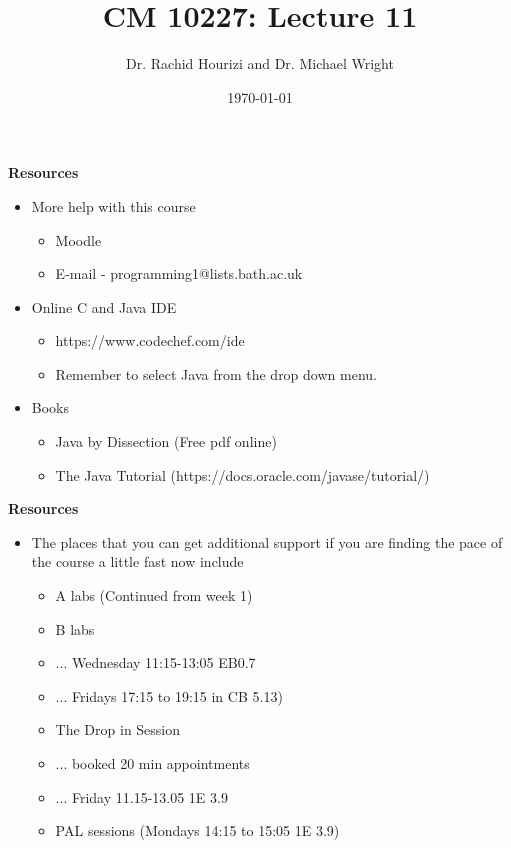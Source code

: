 \documentclass{beamer}
\begin{document}

\title{CM 10227: Lecture 11}
\author{Dr. Rachid Hourizi and Dr. Michael Wright}
\date{\today}
\frame{\titlepage}

\begin{frame} 
\begin{center}
\textbf{Resources}
\end{center}
\begin{itemize}
\item More help with this course
\begin{itemize}
\item Moodle
\item E-mail - programming1@lists.bath.ac.uk
\end{itemize}
\item Online C and Java IDE
\begin{itemize}
\item https://www.codechef.com/ide
\item Remember to select Java from the drop down menu.
\end{itemize}
\item Books
\begin{itemize}
\item Java by Dissection (Free pdf online)
\item The Java Tutorial (https://docs.oracle.com/javase/tutorial/)
\end{itemize}
\end{itemize}
\end{frame}

\begin{frame} 
\begin{center}
\textbf{Resources}
\end{center}
\begin{itemize}
\item The places that you can get additional support if you are finding the pace of the course a little fast now include
\begin{itemize}
\item A labs (Continued from week 1)
\item B labs 
\item ... Wednesday 11:15-13:05 EB0.7
\item ... Fridays 17:15 to 19:15 in CB 5.13)
\item The Drop in Session 
\item ... booked 20 min appointments
\item ... Friday 11.15-13.05 1E 3.9
\item PAL sessions (Mondays 14:15 to 15:05 1E 3.9)
\end{itemize}
\end{itemize}
\end{frame}
\end{document}
